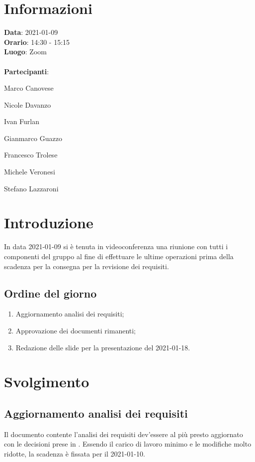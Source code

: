 \section{Informazioni}
\textbf{Data}: 2021-01-09\\
\textbf{Orario}: 14:30 - 15:15\\
\textbf{Luogo}: Zoom\\\\
\textbf{Partecipanti}:\begin{list}{*}{\setlength{\itemsep}{0cm}}
	\item Marco Canovese
	\item Nicole Davanzo
	\item Ivan Furlan
	\item Gianmarco Guazzo
	\item Francesco Trolese
	\item Michele Veronesi
	\item Stefano Lazzaroni
\end{list}

\section{Introduzione}
In data 2021-01-09 si è tenuta in videoconferenza una riunione con tutti i componenti del gruppo al fine di effettuare le ultime operazioni prima della scadenza per la consegna per la revisione dei requisiti.

\subsection{Ordine del giorno}
\begin{enumerate}
    \item Aggiornamento analisi dei requisiti;
    \item Approvazione dei documenti rimanenti;
    \item Redazione delle slide per la presentazione del 2021-01-18.
\end{enumerate}

\section{Svolgimento}
\subsection{Aggiornamento analisi dei requisiti}
Il documento contente l'analisi dei requisiti dev'essere al più presto aggiornato con le decisioni prese in \textit{}.
Essendo il carico di lavoro minimo e le modifiche molto ridotte, la scadenza è fissata per il 2021-01-10.


